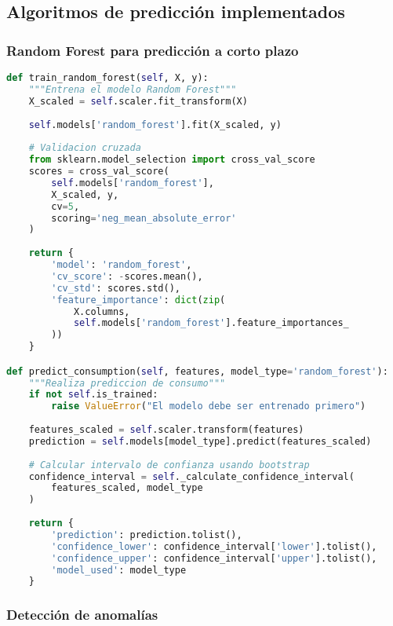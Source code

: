 \subsection{Algoritmos de predicción implementados}

\subsubsection{Random Forest para predicción a corto plazo}

\begin{lstlisting}[language=Python, caption=Implementación Random Forest]
def train_random_forest(self, X, y):
    """Entrena el modelo Random Forest"""
    X_scaled = self.scaler.fit_transform(X)
    
    self.models['random_forest'].fit(X_scaled, y)
    
    # Validacion cruzada
    from sklearn.model_selection import cross_val_score
    scores = cross_val_score(
        self.models['random_forest'], 
        X_scaled, y, 
        cv=5, 
        scoring='neg_mean_absolute_error'
    )
    
    return {
        'model': 'random_forest',
        'cv_score': -scores.mean(),
        'cv_std': scores.std(),
        'feature_importance': dict(zip(
            X.columns, 
            self.models['random_forest'].feature_importances_
        ))
    }

def predict_consumption(self, features, model_type='random_forest'):
    """Realiza prediccion de consumo"""
    if not self.is_trained:
        raise ValueError("El modelo debe ser entrenado primero")
    
    features_scaled = self.scaler.transform(features)
    prediction = self.models[model_type].predict(features_scaled)
    
    # Calcular intervalo de confianza usando bootstrap
    confidence_interval = self._calculate_confidence_interval(
        features_scaled, model_type
    )
    
    return {
        'prediction': prediction.tolist(),
        'confidence_lower': confidence_interval['lower'].tolist(),
        'confidence_upper': confidence_interval['upper'].tolist(),
        'model_used': model_type
    }
\end{lstlisting}

\subsubsection{Detección de anomalías}

